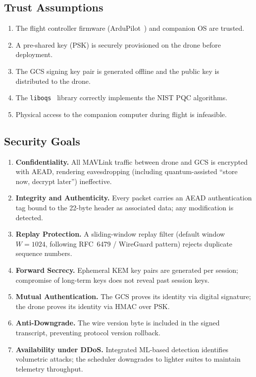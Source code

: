 \documentclass[conference]{IEEEtran}
\begin{document}
\subsection{Trust Assumptions}

\begin{enumerate}[label=\textbf{T\arabic*}]
    \item The flight controller firmware (ArduPilot~\cite{ardupilot}) and companion OS are trusted.
    \item A pre-shared key (PSK) is securely provisioned on the drone before deployment.
    \item The GCS signing key pair is generated offline and the public key is distributed to the drone.
    \item The \texttt{liboqs}~\cite{liboqs} library correctly implements the NIST PQC algorithms.
    \item Physical access to the companion computer during flight is infeasible.
\end{enumerate}

\subsection{Security Goals}

\begin{enumerate}[label=\textbf{G\arabic*}]
    \item \textbf{Confidentiality.} All MAVLink traffic between drone and GCS is encrypted with AEAD, rendering eavesdropping (including quantum-assisted ``store now, decrypt later'') ineffective.
    \item \textbf{Integrity and Authenticity.} Every packet carries an AEAD authentication tag bound to the 22-byte header as associated data; any modification is detected.
    \item \textbf{Replay Protection.} A sliding-window replay filter (default window $W = 1024$, following RFC~6479 / WireGuard pattern) rejects duplicate sequence numbers.
    \item \textbf{Forward Secrecy.} Ephemeral KEM key pairs are generated per session; compromise of long-term keys does not reveal past session keys.
    \item \textbf{Mutual Authentication.} The GCS proves its identity via digital signature; the drone proves its identity via HMAC over PSK.
    \item \textbf{Anti-Downgrade.} The wire version byte is included in the signed transcript, preventing protocol version rollback.
    \item \textbf{Availability under DDoS.} Integrated ML-based detection identifies volumetric attacks; the scheduler downgrades to lighter suites to maintain telemetry throughput.
\end{enumerate}
\end{document}
